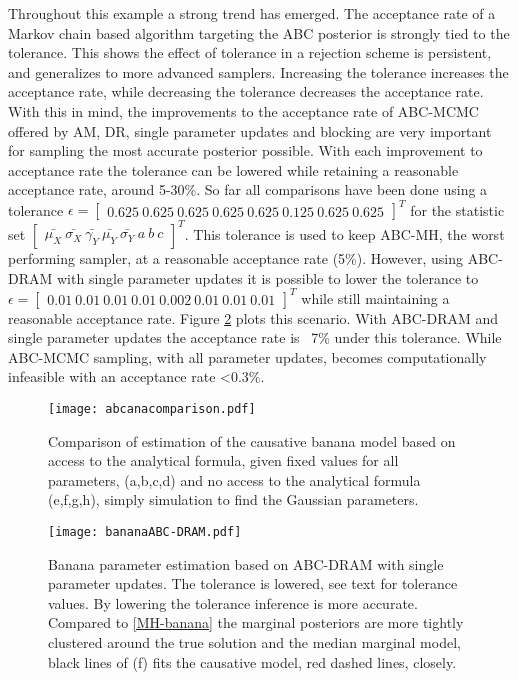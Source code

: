 Throughout this example a strong trend has emerged. The acceptance rate of a Markov chain based algorithm targeting the ABC posterior is strongly tied to the tolerance. This shows the effect of tolerance in a rejection scheme is persistent, and generalizes to more advanced samplers. Increasing the tolerance increases the acceptance rate, while decreasing the tolerance decreases the acceptance rate. With this in mind, the improvements to the acceptance rate of ABC-MCMC offered by AM, DR, single parameter updates and blocking are very important for sampling the most accurate posterior possible. With each improvement to acceptance rate the tolerance can be lowered while retaining a reasonable acceptance rate, around 5-30\%. So far all comparisons have been done using a tolerance $\epsilon =\begin{bmatrix}
0.625\ 0.625\ 0.625\ 0.625\ 0.625\ 0.125\ 0.625\ 0.625
\end{bmatrix}^T$ 
for the statistic set $\begin{bmatrix}
\bar{\mu_X}\ \bar{\sigma_X}\ \bar{\gamma_Y}\ \bar{\mu_Y}\ \bar{\sigma_Y}\ a\ b\ c
\end{bmatrix}^T$. This tolerance is used to keep ABC-MH, the worst performing sampler, at a reasonable acceptance rate (5\%). However, using ABC-DRAM with single parameter updates it is possible to lower the tolerance to 
$\epsilon = \begin{bmatrix}
0.01\ 0.01\ 0.01\ 0.01\ 0.002\ 0.01\ 0.01\ 0.01
\end{bmatrix}^T$
while still maintaining a reasonable acceptance rate. Figure \ref{best-banana} plots this scenario. With ABC-DRAM and single parameter updates the acceptance rate is ~7\% under this tolerance. While ABC-MCMC sampling, with all parameter updates, becomes computationally infeasible with an acceptance rate <0.3\%.

\begin{figure}[H]
\centering
\texttt{[image: abcanacomparison.pdf]}
\caption{Comparison of estimation of the causative banana model based on access to the analytical formula, given fixed values for all parameters, (a,b,c,d) and no access to the analytical formula (e,f,g,h), simply simulation to find the Gaussian parameters.}
\label{the-comparison}
\end{figure}

\begin{figure}[H]
\centering
\texttt{[image: bananaABC-DRAM.pdf]}
\caption{Banana parameter estimation based on ABC-DRAM with single parameter updates. The tolerance is lowered, see text for tolerance values. By lowering the tolerance inference is more accurate. Compared to \ref{MH-banana} the marginal posteriors are more tightly clustered around the true solution and the median marginal model, black lines of (f) fits the causative model, red dashed lines, closely.}
\label{best-banana}
\end{figure}